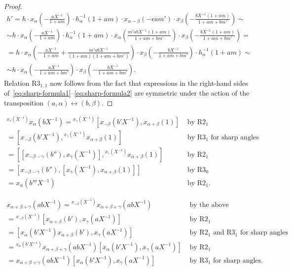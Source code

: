 \documentclass[oneside, 8pt]{amsart}
\theoremstyle{remark}
\theoremstyle{definition}
\numberwithin{equation}{section}
\begin{document}
\begin{proof}
\begin{multline} \label{eq:sharp-formula2}
 h' = h \cdot x_\alpha\left(-\tfrac{aX^{-1}}{1 + am}\right) \cdot h^{-1}_\alpha(1 + am) \cdot x_{\alpha-\beta}(-\epsilon am') \cdot x_\beta\left(-\tfrac{bX^{-1}(1+am)}{1 + am + bm'}\right) \sim \\
    \sim h \cdot x_\alpha\left(-\tfrac{aX^{-1}}{1 + am}\right) \cdot h^{-1}_\alpha(1 + am) \cdot x_{\alpha}\left(\tfrac{m'abX^{-1}(1+am)}{1 + am + bm'}\right) \cdot x_\beta\left(-\tfrac{bX^{-1}(1+am)}{1 + am + bm'}\right) = \\
 = h \cdot x_\alpha\left(-\tfrac{aX^{-1}}{1 + am} + \tfrac{m'abX^{-1}}{(1+am)(1 + am + bm')}\right) \cdot x_\beta\left(-\tfrac{bX^{-1}}{1 + am + bm'}\right) \cdot h^{-1}_\alpha(1 + am) \sim \\
 \sim h \cdot x_\alpha\left(-\tfrac{aX^{-1}}{1 + am + bm'}\right) \cdot x_\beta\left(-\tfrac{bX^{-1}}{1 + am + bm'}\right).
\end{multline}
Relation $\text{R3}_{1,1}$ now follows from the fact that expressions in the right-hand sides of~\eqref{eq:sharp-formula1}--\eqref{eq:sharp-formula2} are symmetric under
 the action of the transposition $(a, \alpha) \leftrightarrow (b, \beta)$.
\end{proof}

\begin{align*} {}^{x_\gamma(X^{-1})}x_\alpha(bX^{-1}) = {}^{x_\gamma(X^{-1})}[x_{-\beta}(b'X^{-1}), x_{\alpha+\beta}(1)] & \text{ by R$2_1$}\\
 = [x_{-\beta}(b'X^{-1}), {}^{x_\gamma(X^{-1})}x_{\alpha+\beta}(1)] & \text{ by R$3_1$ for sharp angles}\\
 = [[x_{-\beta-\gamma}(b''), x_\gamma(X^{-1})], {}^{x_\gamma(X^{-1})}x_{\alpha+\beta}(1)] & \text{ by R$2_1$}\\
 = [x_{-\beta-\gamma}(b''), [x_\gamma(X^{-1}), x_{\alpha+\beta}(1)]] & \text{ by R$3_0$}\\
 = x_{\alpha}(b'''X^{-1}) & \text{ by R$2_1$.} \end{align*}

\begin{align*} x_{\alpha+\beta+\gamma}(abX^{-1}) = {}^{x_{-\beta}(X^{-1})}\!x_{\alpha+\beta+\gamma}(abX^{-1}) & \text{ by the above relation}\\
 = {}^{x_{-\beta}(X^{-1})}\![x_{\alpha+\beta}(b'), x_\gamma(aX^{-1})] & \text{ by R$2_1$} \\
 = [x_{\alpha}(b'X^{-1}) x_{\alpha+\beta}(b'), x_\gamma(aX^{-1})] & \text{ by R$2_1$ and R$3_1$ for sharp angles }\\
 = {}^{x_{\alpha}(b'X^{-1})}\!x_{\alpha+\beta+\gamma}(abX^{-1}) [x_{\alpha}(b'X^{-1}), x_\gamma(aX^{-1})] & \text{ by R$2_1$} \\
 = x_{\alpha+\beta+\gamma}(abX^{-1}) [x_{\alpha}(b'X^{-1}), x_\gamma(aX^{-1})] & \text{ by R$3_1$ for sharp angles.} \end{align*}

%
 
\printbibliography
\end{document}
